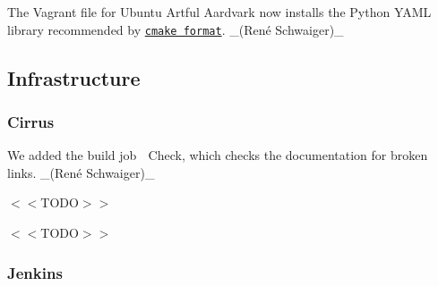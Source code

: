 \begin{DoxyItemize}
\item The Vagrant file for Ubuntu Artful Aardvark now installs the Python Y\+A\+ML library recommended by \href{https://github.com/cheshirekow/cmake_format}{\tt cmake format}. \+\_\+(René Schwaiger)\+\_\+
\end{DoxyItemize}

\subsection*{Infrastructure}

\subsubsection*{Cirrus}


\begin{DoxyItemize}
\item We added the build job {\ttfamily 🔗 Check}, which checks the documentation for broken links. \+\_\+(René Schwaiger)\+\_\+
\item $<$$<$\+T\+O\+D\+O$>$$>$
\item $<$$<$\+T\+O\+D\+O$>$$>$
\end{DoxyItemize}

\subsubsection*{Jenkins}



